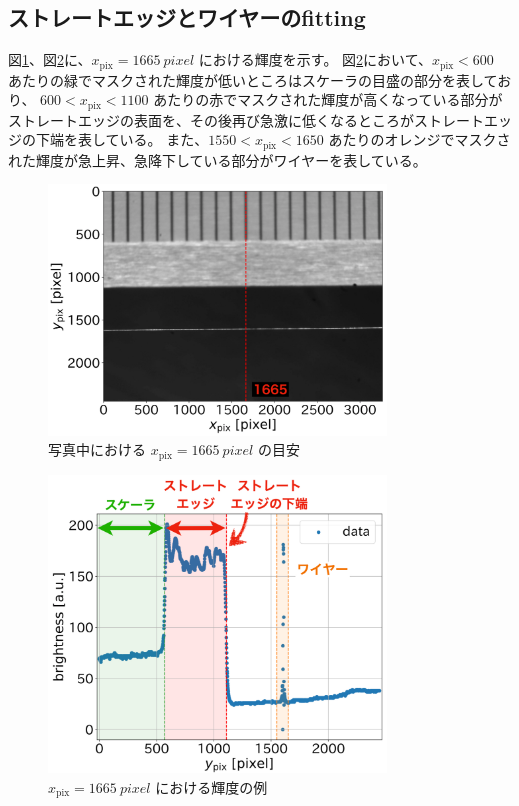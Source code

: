 \documentclass[../../main.tex]{subfiles}
\begin{document}
\subsection{ストレートエッジとワイヤーのfitting}
図\ref{fig:wiresag_edge_target}、図\ref{fig:wiresag_edge_brightness}に、$x_{\mathrm{pix}}=\SI{1665}{pixel}$ における輝度を示す。
図\ref{fig:wiresag_edge_brightness}において、$x_{\mathrm{pix}}<600$ あたりの緑でマスクされた輝度が低いところはスケーラの目盛の部分を表しており、
$600 < x_{\mathrm{pix}} < 1100$ あたりの赤でマスクされた輝度が高くなっている部分がストレートエッジの表面を、その後再び急激に低くなるところがストレートエッジの下端を表している。
また、$1550 < x_{\mathrm{pix}} < 1650$ あたりのオレンジでマスクされた輝度が急上昇、急降下している部分がワイヤーを表している。
\begin{figure}[H]
    \centering
    \includegraphics[width=0.8\textwidth]{wiresag/wiresag_edge_target.pdf}
    \caption{写真中における $x_{\mathrm{pix}}=\SI{1665}{pixel}$ の目安}
    \label{fig:wiresag_edge_target}
\end{figure}
\begin{figure}[H]
    \centering
    \includegraphics[width=0.8\textwidth]{wiresag/wiresag_edge_brightness.pdf}
    \caption{$x_{\mathrm{pix}}=\SI{1665}{pixel}$ における輝度の例}
    \label{fig:wiresag_edge_brightness}
\end{figure}
\end{document}
